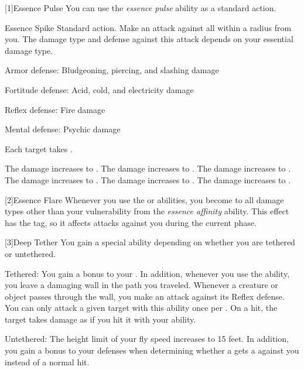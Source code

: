     [1]{Essence Pulse} You can use the \textit{essence pulse} ability as a standard action.
    \begin{magicalactiveability}{Essence Spike}
        \abilityusagetime Standard action.
        \rankline
        Make an attack against all  within a \smallarea radius from you.
        The damage type and defense against this attack depends on your essential damage type.
        \begin{raggeditemize}
            \item Armor defense: Bludgeoning, piercing, and slashing damage
            \item Fortitude defense: Acid, cold, and electricity damage
            \item Reflex defense: Fire damage
            \item Mental defense: Psychic damage
        \end{raggeditemize}
        \hit Each target takes \damagerankone{}.

        \rankline
         The damage increases to \damageranktwo{}.
         The damage increases to \damagerankthree{}.
         The damage increases to \damagerankfour{}.
         The damage increases to \damagerankfive{}.
         The damage increases to \damageranksix{}.
         The damage increases to \damagerankseven{}.
    \end{magicalactiveability}

    [2]{Essence Flare} Whenever you use the  or  abilities, you  become \impervious to all damage types other than your vulnerability from the \textit{essence affinity} ability.
    This effect has the  tag, so it affects attacks against you during the current phase.

    [3]{Deep Tether} You gain a special ability depending on whether you are tethered or untethered.
    \begin{raggeditemize}
        \item Tethered: You gain a  bonus to your .
            In addition, whenever you use the  ability, you leave a damaging wall in the path you traveled.
            Whenever a creature or object passes through the wall, you make an attack against its Reflex defense.
            You can only attack a given target with this ability once per .
            On a hit, the target takes damage as if you hit it with your  ability.
        \item Untethered: The height limit of your fly speed increases to 15 feet.
            In addition, you gain a  bonus to your defenses when determining whether a  gets a  against you instead of a normal hit.
    \end{raggeditemize}

